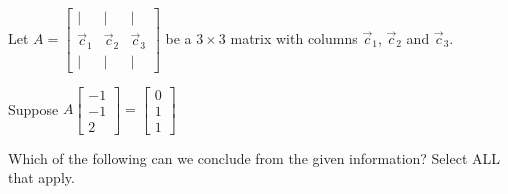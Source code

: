\documentclass{ximera}
\author{Anna Davis}
\begin{document}
\begin{exercise}
Let $A=\begin{bmatrix}|&|&|\\\vec{c}_1& \vec{c}_2 & \vec{c}_3\\|&|&|\end{bmatrix}$ be a $3\times 3$ matrix with columns $\vec{c}_1$, $\vec{c}_2$ and $\vec{c}_3$.

Suppose $A\begin{bmatrix}-1\\-1\\2\end{bmatrix}=\begin{bmatrix}0\\1\\1\end{bmatrix}$

Which of the following can we conclude from the given information?  Select ALL that apply.
\begin{selectAll}
  \end{selectAll}
\end{exercise}

\end{document}
